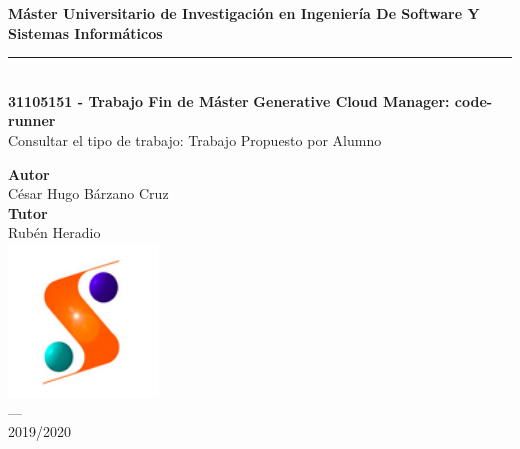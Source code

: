 \begin{titlepage}
 
 

\setlength{\centeroffset}{-0.5\oddsidemargin}
\addtolength{\centeroffset}{0.5\evensidemargin}
\thispagestyle{empty}

\noindent\hspace*{\centeroffset}\begin{minipage}{\textwidth}

\centering


{\Huge\bfseries Máster Universitario de Investigación en Ingeniería De Software Y Sistemas Informáticos\\}

\noindent\rule[-1ex]{\textwidth}{3pt}\\[3.5ex]
{\large\bfseries 31105151 - Trabajo Fin de Máster}
\textbf{Generative Cloud Manager: code-runner}\\[2.5ex]
{Consultar el tipo de trabajo: Trabajo Propuesto por Alumno}\\[2.5ex]
\end{minipage}

\vspace{2.5cm}
\noindent\hspace*{\centeroffset}\begin{minipage}{\textwidth}
\centering

\textbf{Autor}\\ {César Hugo Bárzano Cruz}\\[2.5ex]
\textbf{Tutor}\\ {Rubén Heradio}\\[2.5ex]


\includegraphics[width=0.3\textwidth]{imagenes/Logo-master.png}\\[0.1cm]
\textsc{---}\\
2019/2020
\end{minipage}

\end{titlepage}


